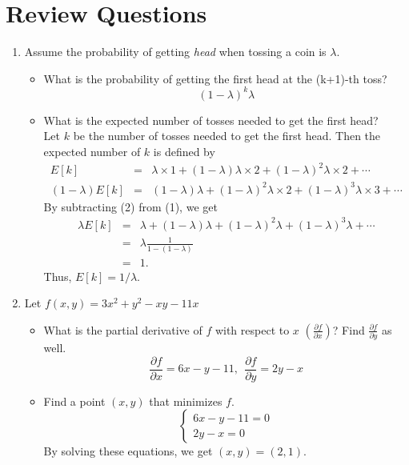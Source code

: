 

\oddsidemargin 0in
\evensidemargin 0in
\textwidth 6.5in
\topmargin -0.5in
\textheight 9.0in




\pagestyle{myheadings}  %

\section{Review Questions}

\begin{enumerate}
\item Assume the probability of getting {\it head} when tossing a coin is $\lambda$.
\begin{itemize}
\item What is the probability of getting the first head at the (k+1)-th toss?
\[
(1-\lambda)^k \lambda
\]
\item What is the expected number of tosses needed to get the first head?\\
Let $k$ be the number of tosses needed to get the first head. Then the expected number of $k$ is defined by
\begin{eqnarray}
E[k]&=&\lambda \times 1 + (1-\lambda) \lambda \times 2 + (1-\lambda)^2 \lambda \times 2 + \cdots\\
(1-\lambda)E[k]&=&(1-\lambda)\lambda + (1-\lambda)^2 \lambda \times 2 + (1-\lambda)^3 \lambda \times 3 + \cdots
\end{eqnarray}
By subtracting (2) from (1), we get
\begin{eqnarray*}
\lambda E[k] &=& \lambda + (1-\lambda) \lambda + (1-\lambda)^2 \lambda + (1-\lambda)^3 \lambda + \cdots\\
 &=&\lambda \frac{1}{1 - (1 - \lambda)}\\
 &=&1 .
\end{eqnarray*}
Thus, $E[k]=1 / \lambda $.
\end{itemize}

\item Let $f(x, y)=3x^2+y^2-xy-11x$

\begin{itemize}
\item What is the partial derivative of $f$ with respect to $x$ $(\frac{\partial f}{\partial x})$? Find $\frac{\partial f}{\partial y}$ as well.
\[
\frac{\partial f}{\partial x}=6x-y-11,\:\:  \frac{\partial f}{\partial y}=2y - x
\]
\item Find a point $(x, y)$ that minimizes $f$.
\[
\left\{
\begin{array}{l}
6x-y-11=0 \\
2y-x=0
\end{array}
\right.
\]
By solving these equations, we get $(x, y)=(2, 1)$.
\end{itemize}


\end{enumerate}
